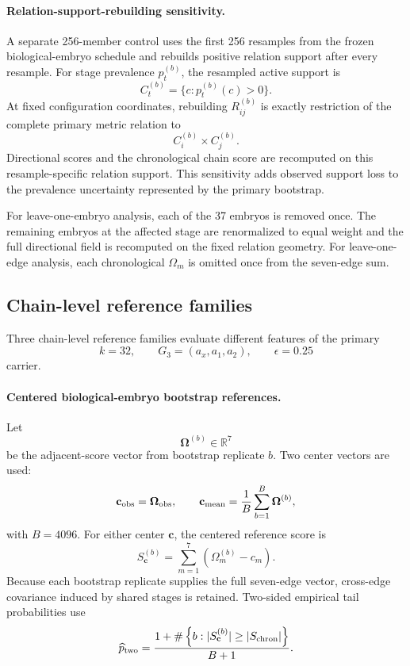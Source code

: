 \documentclass[11pt]{article}
\begin{document}
\paragraph{Relation-support-rebuilding sensitivity.}
A separate 256-member control uses the first 256 resamples from the frozen biological-embryo schedule and rebuilds positive relation support after every resample. For stage prevalence \(p_t^{(b)}\), the resampled active support is
\[
C_t^{(b)}=\{c:p_t^{(b)}(c)>0\}.
\]
At fixed configuration coordinates, rebuilding \(R_{ij}^{(b)}\) is exactly restriction of the complete primary metric relation to
\[
C_i^{(b)}\times C_j^{(b)}.
\]
Directional scores and the chronological chain score are recomputed on this resample-specific relation support. This sensitivity adds observed support loss to the prevalence uncertainty represented by the primary bootstrap.

For leave-one-embryo analysis, each of the 37 embryos is removed once. The remaining embryos at the affected stage are renormalized to equal weight and the full directional field is recomputed on the fixed relation geometry. For leave-one-edge analysis, each chronological \(\Omega_m\) is omitted once from the seven-edge sum.

\subsection{Chain-level reference families}

Three chain-level reference families evaluate different features of the primary
\[
k=32,\qquad G_3=(a_x,a_1,a_2),\qquad\epsilon=0.25
\]
carrier.

\paragraph{Centered biological-embryo bootstrap references.}
Let
\[
\boldsymbol\Omega^{(b)}\in\mathbb R^7
\]
be the adjacent-score vector from bootstrap replicate \(b\). Two center vectors are used:
\[
\mathbf c_{\rm obs}
=
\boldsymbol\Omega_{\rm obs},
\qquad
\mathbf c_{\rm mean}
=
\frac1B\sum_{b=1}^{B}\boldsymbol\Omega^{(b)},
\]
with \(B=4096\). For either center \(\mathbf c\), the centered reference score is
\begin{equation}
S_{\mathbf c}^{(b)}
=
\sum_{m=1}^{7}
\left(
\Omega_m^{(b)}-c_m
\right).
\label{eq:centeredbootstrap}
\end{equation}
Because each bootstrap replicate supplies the full seven-edge vector, cross-edge covariance induced by shared stages is retained. Two-sided empirical tail probabilities use
\begin{equation}
\widehat p_{\rm two}
=
\frac{
1+
\#\left\{
b:
|S_{\mathbf c}^{(b)}|
\ge
|S_{\rm chron}|
\right\}
}{
B+1
}.
\label{eq:empiricalp}
\end{equation}
\end{document}
